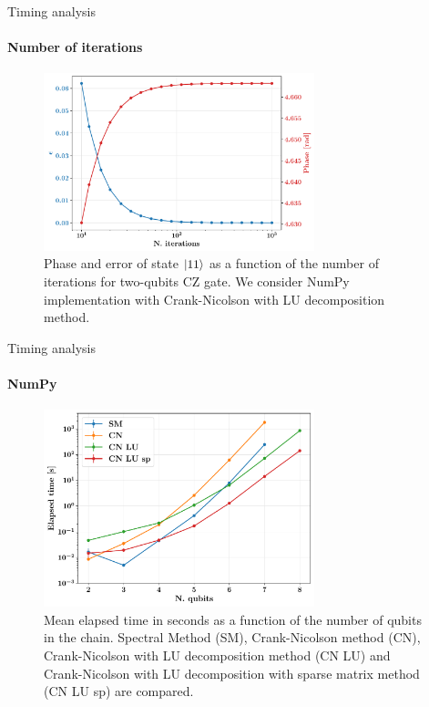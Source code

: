 \documentclass[8pt]{beamer}
\begin{document}
\begin{frame}[c]{Timing analysis}
\framesubtitle{Number of iterations}
    \begin{figure}[H]
    \centering
    \includegraphics[width=0.7\textwidth]{images/timing/numpy_iter_fidelity_phase.pdf}
    \caption{Phase and error of state $\left\vert{11}\right\rangle$ as a function of the number of iterations for two-qubits CZ gate. We consider NumPy implementation with Crank-Nicolson with LU decomposition method.}
    \end{figure}
\end{frame}

\begin{frame}[c]{Timing analysis}
\framesubtitle{NumPy}
    \begin{figure}[H]
    \centering
    \includegraphics[width=0.7\textwidth]{images/timing/time_numpy.pdf}
    \caption{Mean elapsed time in seconds as a function of the number of qubits in the chain. Spectral Method (SM), Crank-Nicolson method (CN),  Crank-Nicolson with LU decomposition method (CN LU) and Crank-Nicolson with LU decomposition with sparse matrix method (CN LU sp) are compared.}
    \end{figure}
\end{frame}
\end{document}
